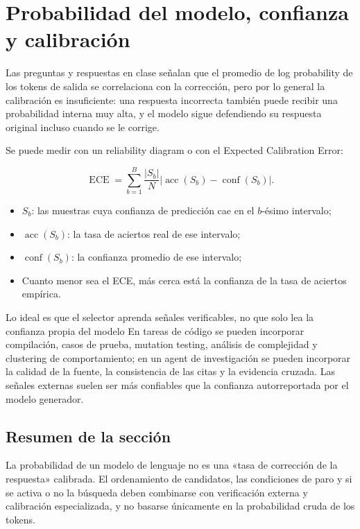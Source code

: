 \section{Probabilidad del modelo, confianza y calibración}

Las preguntas y respuestas en clase señalan que el promedio de log probability de los tokens de salida se correlaciona con la corrección, pero por lo general la calibración es insuficiente: una respuesta incorrecta también puede recibir una probabilidad interna muy alta, y el modelo sigue defendiendo su respuesta original incluso cuando se le corrige.

Se puede medir con un reliability diagram o con el Expected Calibration Error:

$$
\operatorname{ECE}=\sum_{b=1}^{B}\frac{|S_b|}{N}
\left|\operatorname{acc}(S_b)-\operatorname{conf}(S_b)\right|.
$$

\begin{itemize}
    \item $S_b$: las muestras cuya confianza de predicción cae en el $b$-ésimo intervalo;
    \item $\operatorname{acc}(S_b)$: la tasa de aciertos real de ese intervalo;
    \item $\operatorname{conf}(S_b)$: la confianza promedio de ese intervalo;
    \item Cuanto menor sea el ECE, más cerca está la confianza de la tasa de aciertos empírica.
\end{itemize}

\begin{knowledgebox}{Lo ideal es que el selector aprenda señales verificables, no que solo lea la confianza propia del modelo}
En tareas de código se pueden incorporar compilación, casos de prueba, mutation testing, análisis de complejidad y clustering de comportamiento; en un agent de investigación se pueden incorporar la calidad de la fuente, la consistencia de las citas y la evidencia cruzada. Las señales externas suelen ser más confiables que la confianza autorreportada por el modelo generador.
\end{knowledgebox}

\subsection{Resumen de la sección}

La probabilidad de un modelo de lenguaje no es una «tasa de corrección de la respuesta» calibrada. El ordenamiento de candidatos, las condiciones de paro y si se activa o no la búsqueda deben combinarse con verificación externa y calibración especializada, y no basarse únicamente en la probabilidad cruda de los tokens.

